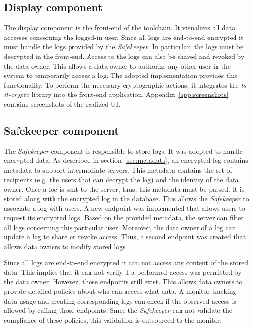 \documentclass[../main.tex]{subfiles}
\begin{document}
\subsection{Display component}
The display component is the front-end of the toolchain.
It visualizes all data accesses concerning the logged-in user.
Since all logs are end-to-end encrypted it must handle the logs provided by the \emph{Safekeeper}.
In particular, the logs must be decrypted in the front-end.
Access to the logs can also be shared and revoked by the data owner.
This allows a data owner to authorize any other user in the system to temporarily access a log.
The adopted implementation provides this functionality.
To perform the necessary cryptographic actions, it integrates the \emph{ts-it-crypto} library into the front-end application.
Appendix~\ref{app:screenshots} contains screenshots of the realized UI.

\subsection{Safekeeper component}
The \emph{Safekeeper} component is responsible to store logs.
It was adopted to handle encrypted data.
As described in section~\ref{sec:metadata}, an encrypted log contains metadata to support intermediate servers.
This metadata contains the set of recipients (e.g. the users that can decrypt the log) and the identity of the data owner.
Once a loc is sent to the server, thus, this metadata must be parsed.
It is stored along with the encrypted log in the database.
This allows the \emph{Safekeeper} to associate a log with users.
A new endpoint was implemented that allows users to request its encrypted logs.
Based on the provided metadata, the server can filter all logs concerning this particular user.
Moreover, the data owner of a log can update a log to share or revoke access.
Thus, a second endpoint was created that allows data owners to modify stored logs.

Since all logs are end-to-end encrypted it can not access any content of the stored data.
This implies that it can not verify if a performed access was permitted by the data owner.
However, those endpoints still exist.
This allows data owners to provide detailed policies about who can access what data.
A monitor tracking data usage and creating corresponding logs can check if the observed access is allowed by calling those endpoints.
Since the \emph{Safekeeper} can not validate the compliance of these policies, this validation is outsourced to the monitor.
\end{document}
